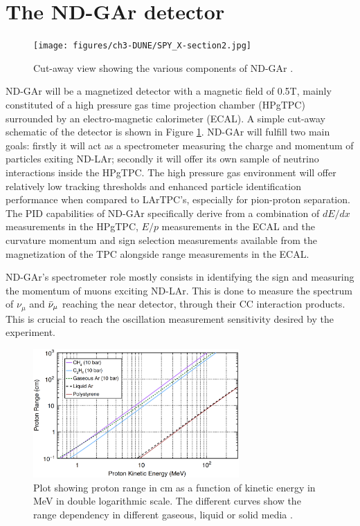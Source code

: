 \section{The ND-GAr detector}
\label{sec:DUNE-ND-GAr}

\begin{figure}[t]
     \centering
     \texttt{[image: figures/ch3-DUNE/SPY\_X-section2.jpg]}
     \caption[Cut-away view showing the various components of ND-GAr.]{Cut-away view showing the various components of ND-GAr \cite{Bersani:2023rlw}.}
        \label{fig:ND-G}
\end{figure}

ND-GAr will be a magnetized detector with a magnetic field of 0.5T, mainly constituted of a high pressure gas time projection chamber (HPgTPC) surrounded by an electro-magnetic calorimeter (ECAL). A simple cut-away schematic of the detector is shown in Figure \ref{fig:ND-G}. ND-GAr will fulfill two main goals: firstly it will act as a spectrometer measuring the charge and momentum of particles exiting ND-LAr; secondly it will offer its own sample of neutrino interactions inside the HPgTPC. The high pressure gas environment will offer relatively low tracking thresholds and enhanced particle identification performance when compared to LArTPC's, especially for pion-proton separation. The PID capabilities of ND-GAr specifically derive from a combination of $dE/dx$ measurements in the HPgTPC, $E/p$ measurements in the ECAL and the curvature momentum and sign selection measurements available from the magnetization of the TPC alongside range measurements in the ECAL.

ND-GAr's spectrometer role mostly consists in identifying the sign and measuring the momentum of muons exciting ND-LAr. This is done to measure the spectrum of $\nu_\mu$ and $\Bar{\nu}_\mu$ reaching the near detector, through their CC interaction products. This is crucial to reach the oscillation measurement sensitivity desired by the experiment.

\begin{figure}[t]
     \centering
     \includegraphics[width=0.7\textwidth]{figures/ch3-DUNE/threshold.png}
     \caption[Plot showing proton range in cm as a function of kinetic energy.]{Plot showing proton range in cm as a function of kinetic energy in MeV in double logarithmic scale. The different curves show the range dependency in different gaseous, liquid or solid media \cite{Lu}.}
        \label{fig:ND-G-threshold}
\end{figure}

